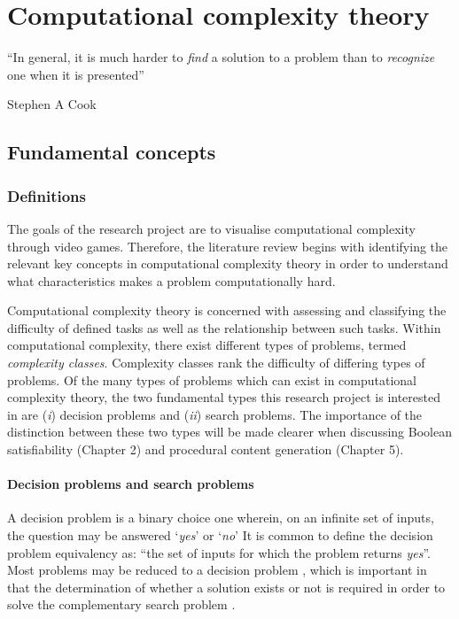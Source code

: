 \documentclass[11pt, a4paper, oneside]{report} %
\begin{document}
\chapter{Computational complexity theory}

\epigraph{``In general, it is much harder to \textit{find} a solution to a problem than to
\textit{recognize} one when it is presented''}{Stephen A Cook \cite{cook1984can}}

\section{Fundamental concepts}

\subsection{Definitions}

The goals of the research project are to visualise computational complexity
through video games. Therefore, the literature review begins with identifying
the relevant key concepts in computational complexity theory in order to
understand what characteristics makes a problem computationally hard.

Computational complexity theory is concerned with assessing and classifying the
difficulty of defined tasks as well as the relationship between such tasks.
Within computational complexity, there exist different types of problems, termed
\textit{complexity classes}. Complexity classes rank the difficulty of differing
types of problems. Of the many types of problems which can exist in
computational complexity theory, the two fundamental types this research project
is interested in are (\textit{i}) decision problems and (\textit{ii}) search
problems. The importance of the distinction between these two types will be made
clearer when discussing Boolean satisfiability (Chapter 2) and procedural
content generation (Chapter 5).

\subsubsection{Decision problems and search problems}

A decision problem is a binary choice one wherein, on an infinite set of inputs,
the question may be answered `\textit{yes}' or `\textit{no}'  It is common  to
define the decision problem equivalency as: ``the set of inputs for which the
problem returns \textit{yes}''. Most problems may be reduced to a decision
problem \cite{kendall2008survey}, which is important in that the determination
of whether a solution exists or not is required in order to solve the
complementary search problem \cite{Goldreich:2008}.
\end{document}
